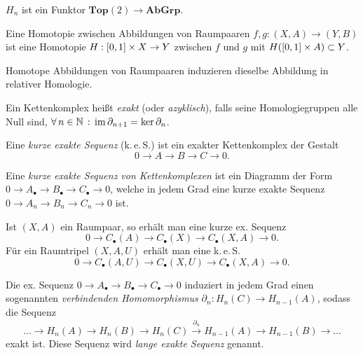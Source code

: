 \documentclass{cheat-sheet}
\newcommand{\CC}[1]{{#1}_{\bullet}} %
\newcommand{\Top}{\mathbf{Top}} %
\newcommand{\AbGrp}{\mathbf{AbGrp}} %
\newcommand{\keS}{k.\,e.\,S.} %
\begin{document}
\begin{bem}
  $H_n$ ist ein Funktor $\Top(2) \to \AbGrp$.
\end{bem}

\begin{defn}
  Eine Homotopie zwischen Abbildungen von Raumpaaren $f, g : (X, A) \to (Y, B)$ ist eine Homotopie $H : \left[ 0, 1 \right] \times X \to Y$ zwischen $f$ und $g$ mit $H(\left[ 0, 1 \right] \times A) \subset Y$.
\end{defn}

\begin{prop}
  Homotope Abbildungen von Raumpaaren induzieren dieselbe Abbildung in relativer Homologie.
\end{prop}

\begin{defn}
  Ein Kettenkomplex heißt \emph{exakt} (oder \emph{azyklisch}), falls seine Homologiegruppen alle Null sind, \dh{} $\forall \, {n \in \mathbb{N}} \,:\, \mathop{\mathrm{im}} \partial_{n+1} = \ker \partial_n$.
\end{defn}

\begin{defn}
  Eine \emph{kurze exakte Sequenz} (\keS{}) ist ein exakter Kettenkomplex der Gestalt
  \[ 0 \to A \to B \to C \to 0. \]
\end{defn}

\begin{defn}
  Eine \emph{kurze exakte Sequenz von Kettenkomplexen} ist ein Diagramm der Form
  $0 \to \CC{A} \to \CC{B} \to \CC{C} \to 0$, welche
  in jedem Grad eine kurze exakte Sequenz
  $0 \to A_n \to B_n \to C_n \to 0$
  ist.
\end{defn}

\begin{bem}
  Ist $(X, A)$ ein Raumpaar, so erhält man eine kurze ex. Sequenz
  \[ 0 \to \CC{C}(A) \to \CC{C}(X) \to \CC{C}(X, A) \to 0. \]
  Für ein Raumtripel $(X, A, U)$ erhält man eine \keS{}
  \[ 0 \to \CC{C}(A, U) \to \CC{C}(X, U) \to \CC{C}(X, A) \to 0. \]
\end{bem}

\begin{prop}
  Die ex. Sequenz $0 \to \CC{A} \to \CC{B} \to \CC{C} \to 0$ induziert in jedem Grad einen sogenannten \emph{verbindenden Homomorphismus} $\partial_n : H_n(C) \to H_{n-1}(A)$, sodass die Sequenz
  \[ \ldots \to H_n(A) \to H_n(B) \to H_n(C) \xrightarrow{\partial_n} H_{n-1}(A) \to H_{n-1}(B) \to \ldots \]
  exakt ist. Diese Sequenz wird \emph{lange exakte Sequenz} genannt.
\end{prop}
\end{document}
